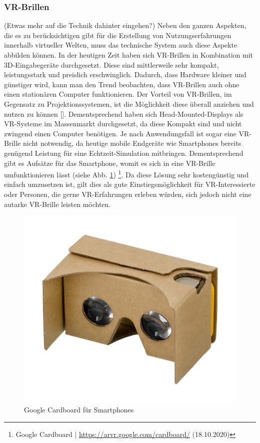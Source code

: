 \documentclass[a4paper,12pt,oneside]{article}
\begin{document}
      \subsubsection{VR-Brillen}
        (Etwas mehr auf die Technik dahinter eingehen?)
        Neben den ganzen Aspekten, die es zu berücksichtigen gibt für die Erstellung von
        Nutzungserfahrungen innerhalb virtueller Welten, muss das technische System auch
        diese Aspekte abbilden können. In der heutigen Zeit haben sich VR-Brillen in 
        Kombination mit 3D-Eingabegeräte durchgesetzt. Diese sind mittlerweile sehr kompakt,
        leistungsstark und preislich erschwinglich. Dadurch, dass Hardware kleiner
        und günstiger wird, kann man den Trend beobachten, dass VR-Brillen auch ohne
        einen stationären Computer funktionieren.
        Der Vorteil von VR-Brillen, im Gegensatz zu Projektionssystemen, ist die 
        Möglichkeit diese überall anziehen und nutzen zu können [\cite[129]{Dorner2013}].
        Dementsprechend haben sich Head-Mounted-Displays als VR-Systeme im Massenmarkt
        durchgesetzt, da diese Kompakt sind und nicht zwingend einen Computer benötigen.
        Je nach Anwendungsfall ist sogar eine VR-Brille nicht notwendig, da heutige 
        mobile Endgeräte wie Smartphones bereits genügend Leistung für eine 
        Echtzeit-Simulation mitbringen. Dementsprechend gibt es Aufsätze für das Smartphone,
        womit es sich in eine VR-Brille umfunktionieren lässt (siehe Abb. \ref{fig:google-cardboard})
        \footnote{Google Cardboard | \url{https://arvr.google.com/cardboard/} (18.10.2020)}.
        Da diese Lösung sehr kostengünstig und einfach umzusetzen ist, gilt dies als 
        gute Einstiegsmöglichkeit für VR-Interessierte oder Personen, die gerne
        VR-Erfahrungen erleben würden, sich jedoch nicht eine autarke VR-Brille leisten
        möchten.
        \begin{figure}[t]
          \centering
          \includegraphics{img/google-cardboard.jpg}
          \caption{Google Cardboard für Smartphones}
          \label{fig:google-cardboard}
        \end{figure}
\end{document}
